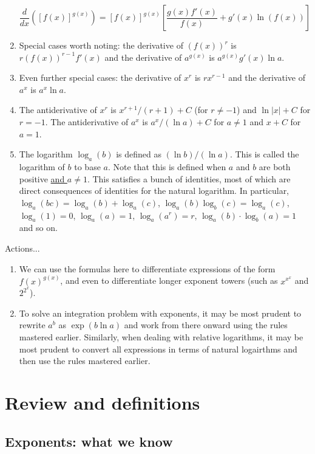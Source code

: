 \documentclass[10pt]{amsart}
\begin{document}
\begin{enumerate}
  $$\frac{d}{dx} \left([f(x)]^{g(x)}\right) = [f(x)]^{g(x)}\left[\frac{g(x)f'(x)}{f(x)} + g'(x)\ln(f(x))\right]$$
\item Special cases worth noting: the derivative of $(f(x))^r$ is
  $r(f(x))^{r-1}f'(x)$ and the derivative of $a^{g(x)}$ is
  $a^{g(x)}g'(x) \ln a$.
\item Even further special cases: the derivative of $x^r$ is
  $rx^{r-1}$ and the derivative of $a^x$ is $a^x \ln a$.
\item The antiderivative of $x^r$ is $x^{r+1}/(r + 1) + C$ (for $r \ne
  -1$) and $\ln|x| + C$ for $r = -1$. The antiderivative of $a^x$ is
  $a^x/(\ln a) + C$ for $a \ne 1$ and $x + C$ for $a = 1$.
\item The logarithm $\log_a(b)$ is defined as $(\ln b)/(\ln a)$. This
  is called the logarithm of $b$ to base $a$. Note that this is
  defined when $a$ and $b$ are both positive \underline{and $a \ne 1$}. This
  satisfies a bunch of identities, most of which are direct
  consequences of identities for the natural logarithm. In particular,
  $\log_a(bc) = \log_a(b) + \log_a(c)$, $\log_a(b)\log_b(c) =
  \log_a(c)$, $\log_a(1) = 0$, $\log_a(a) = 1$, $\log_a(a^r) = r$,
  $\log_a(b) \cdot \log_b(a) = 1$ and so on.
\end{enumerate}

Actions...

\begin{enumerate}
\item We can use the formulas here to differentiate expressions of the
  form $f(x)^{g(x)}$, and even to differentiate longer exponent towers
  (such as $x^{x^x}$ and $2^{2^x}$).
\item To solve an integration problem with exponents, it may be most
  prudent to rewrite $a^b$ as $\exp(b \ln a)$ and work from there
  onward using the rules mastered earlier. Similarly, when dealing
  with relative logarithms, it may be most prudent to convert all
  expressions in terms of natural logairthms and then use the rules
  mastered earlier.
\end{enumerate}

\section{Review and definitions}

\subsection{Exponents: what we know}
\end{document}
